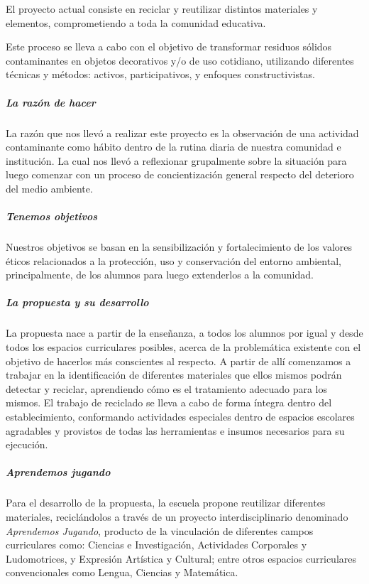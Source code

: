 \documentclass[
]{article}
\begin{document}
El proyecto actual consiste en reciclar y reutilizar distintos
materiales y elementos, comprometiendo a toda la comunidad educativa.

Este proceso se lleva a cabo con el objetivo de transformar residuos
sólidos contaminantes en objetos decorativos y/o de uso cotidiano,
utilizando diferentes técnicas y métodos: activos, participativos, y
enfoques constructivistas.

\hypertarget{la-razuxf3n-de-hacer}{%
\subparagraph{La razón de hacer}\label{la-razuxf3n-de-hacer}}

La razón que nos llevó a realizar este proyecto es la observación de una
actividad contaminante como hábito dentro de la rutina diaria de nuestra
comunidad e institución. La cual nos llevó a reflexionar grupalmente
sobre la situación para luego comenzar con un proceso de concientización
general respecto del deterioro del medio ambiente.

\hypertarget{tenemos-objetivos}{%
\subparagraph{Tenemos objetivos}\label{tenemos-objetivos}}

Nuestros objetivos se basan en la sensibilización y fortalecimiento de
los valores éticos relacionados a la protección, uso y conservación del
entorno ambiental, principalmente, de los alumnos para luego extenderlos
a la comunidad.

\hypertarget{la-propuesta-y-su-desarrollo}{%
\subparagraph{La propuesta y su
desarrollo}\label{la-propuesta-y-su-desarrollo}}

La propuesta nace a partir de la enseñanza, a todos los alumnos por
igual y desde todos los espacios curriculares posibles, acerca de la
problemática existente con el objetivo de hacerlos más conscientes al
respecto. A partir de allí comenzamos a trabajar en la identificación de
diferentes materiales que ellos mismos podrán detectar y reciclar,
aprendiendo cómo es el tratamiento adecuado para los mismos. El trabajo
de reciclado se lleva a cabo de forma íntegra dentro del
establecimiento, conformando actividades especiales dentro de espacios
escolares agradables y provistos de todas las herramientas e insumos
necesarios para su ejecución.

\hypertarget{aprendemos-jugando}{%
\subparagraph{Aprendemos jugando}\label{aprendemos-jugando}}

Para el desarrollo de la propuesta, la escuela propone reutilizar
diferentes materiales, reciclándolos a través de un proyecto
interdisciplinario denominado \emph{Aprendemos Jugando}, producto de la
vinculación de diferentes campos curriculares como: Ciencias e
Investigación, Actividades Corporales y Ludomotrices, y Expresión
Artística y Cultural; entre otros espacios curriculares convencionales
como Lengua, Ciencias y Matemática.
\end{document}
